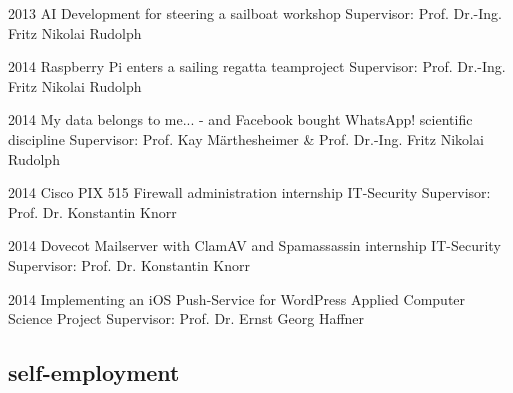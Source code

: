 \documentclass[]{friggeri-cv} %
\begin{document}
\begin{entrylist}


\entry
{2013}
{AI Development for steering a sailboat}
{workshop}
{Supervisor: Prof. Dr.-Ing. Fritz Nikolai Rudolph}


\entry
{2014}
{Raspberry Pi enters a sailing regatta}
{teamproject}
{Supervisor: Prof. Dr.-Ing. Fritz Nikolai Rudolph}


\entry
{2014}
{My data belongs to me... - and Facebook bought WhatsApp!}
{scientific discipline}
{Supervisor: Prof. Kay M\"{a}rthesheimer \& Prof. Dr.-Ing. Fritz Nikolai Rudolph}


\entry
{2014}
{Cisco PIX 515 Firewall administration}
{internship IT-Security}
{Supervisor: Prof. Dr. Konstantin Knorr}


\entry
{2014}
{Dovecot Mailserver with ClamAV and Spamassassin}
{internship IT-Security}
{Supervisor: Prof. Dr. Konstantin Knorr}


\entry
{2014}
{Implementing an iOS Push-Service for WordPress}
{Applied Computer Science Project}
{Supervisor: Prof. Dr. Ernst Georg Haffner}


\end{entrylist}

\subsection{self-employment}
\end{document}
